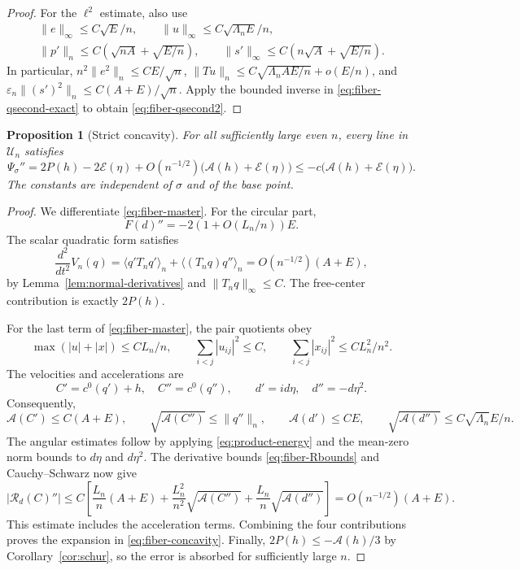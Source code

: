 \documentclass[11pt,reqno]{amsart}
\numberwithin{equation}{section}
\newtheorem{proposition}[theorem]{Proposition}
\theoremstyle{definition}
\theoremstyle{remark}
\newcommand{\A}{\mathcal A}
\newcommand{\E}{\mathcal E}
\newcommand{\av}[1]{\langle #1\rangle_n}
\newcommand{\norm}[1]{\lVert #1\rVert}
\newcommand{\UU}{\mathscr U_n}
\begin{document}
\begin{proof}
For the $\ell^2$ estimate, also use
\[
 \begin{gathered}
 \norm e_\infty\le C\sqrt E/n,\qquad
 \norm u_\infty\le C\sqrt{\Lambda_n E}/n,\\
 \norm{p'}_n\le C(\sqrt{nA}+\sqrt{E/n}),\qquad
 \norm{s'}_\infty\le C(n\sqrt A+\sqrt{E/n}).
 \end{gathered}
\]
In particular,
$n^2\norm{e^2}_n\le CE/\sqrt n$,
$\norm{Tu}_n\le C\sqrt{\Lambda_n AE/n}+o(E/n)$, and
$\varepsilon_n\norm{(s')^2}_n\le C(A+E)/\sqrt n$.
Apply the bounded inverse in \eqref{eq:fiber-qsecond-exact} to obtain
\eqref{eq:fiber-qsecond2}.
\end{proof}

\begin{proposition}[Strict concavity]\label{prop:fiber-concavity}
For all sufficiently large even $n$, every line in $\UU$ satisfies
\begin{equation}\label{eq:fiber-concavity}
 \Psi_\sigma''=2P(h)-2\E(\eta)
       +O(n^{-1/2})\bigl(\A(h)+\E(\eta)\bigr)
 \le-c\bigl(\A(h)+\E(\eta)\bigr).
\end{equation}
The constants are independent of $\sigma$ and of the base point.
\end{proposition}
\begin{proof}
We differentiate \eqref{eq:fiber-master}. For the circular part,
\[
 F(d)''=-2(1+O(L_n/n))E.
\]
The scalar quadratic form satisfies
\[
 \frac{d^2}{dt^2}V_n(q)
 =\av{q'T_nq'}+\av{(T_nq)q''}
 =O(n^{-1/2})(A+E),
\]
by Lemma~\ref{lem:normal-derivatives} and $\norm{T_nq}_\infty\le C$.
The free-center contribution is exactly $2P(h)$.

For the last term of \eqref{eq:fiber-master}, the pair quotients obey
\[
 \max(|u|+|x|)\le CL_n/n,\qquad
 \sum_{i<j}|u_{ij}|^2\le C,\qquad
 \sum_{i<j}|x_{ij}|^2\le CL_n^2/n^2.
\]
The velocities and accelerations are
\[
 C'=c^0(q')+h,\quad C''=c^0(q''),\qquad
 d'=id\eta,\quad d''=-d\eta^2.
\]
Consequently,
\[
 \A(C')\le C(A+E),\qquad
 \sqrt{\A(C'')}\le\norm{q''}_n,\qquad
 \A(d')\le CE,\qquad
 \sqrt{\A(d'')}\le C\sqrt{\Lambda_n}E/n.
\]
The angular estimates follow by applying \eqref{eq:product-energy} and the mean-zero norm bounds to $d\eta$ and $d\eta^2$. The derivative bounds \eqref{eq:fiber-Rbounds} and Cauchy--Schwarz now give
\[
 |\mathscr R_d(C)''|
 \le C\left[\frac{L_n}{n}(A+E)
       +\frac{L_n^2}{n^2}\sqrt{\A(C'')}
       +\frac{L_n}{n}\sqrt{\A(d'')}\right]
 =O(n^{-1/2})(A+E).
\]
This estimate includes the acceleration terms. Combining the four contributions proves the expansion in \eqref{eq:fiber-concavity}. Finally,
$2P(h)\le-\A(h)/3$ by Corollary~\ref{cor:schur}, so the error is absorbed for sufficiently large $n$.
\end{proof}
\end{document}

